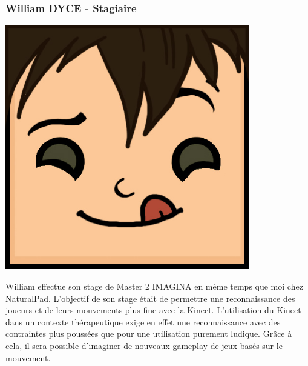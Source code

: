 		\subsubsection*{William DYCE - Stagiaire}
\begin{minipage}[t!]{0.2\linewidth}
\centering
\includegraphics[width=0.8\textwidth]{images/tetocarre/william}
\end{minipage}
\begin{minipage}[t!]{0.79\linewidth}
William effectue son stage de Master 2 IMAGINA en même temps que moi chez NaturalPad. L'objectif de son stage était de permettre une reconnaissance des joueurs et de leurs mouvements plus fine avec la Kinect. L'utilisation du Kinect dans un contexte thérapeutique exige en effet une reconnaissance avec des contraintes plus poussées que pour une utilisation purement ludique. Grâce à cela, il sera possible d’imaginer de nouveaux gameplay de jeux basés sur le mouvement.
\end{minipage}

